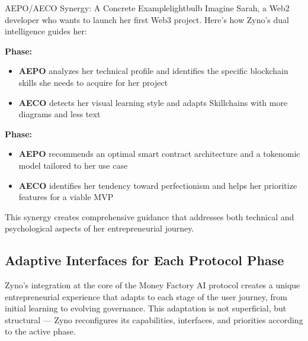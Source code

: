 \begin{mfai-box}{AEPO/AECO Synergy: A Concrete Example}{lightbulb}
Imagine Sarah, a Web2 developer who wants to launch her first Web3 project. Here's how Zyno's dual intelligence guides her:

\textbf{ Phase:}
\begin{itemize}
    \item \textbf{AEPO} analyzes her technical profile and identifies the specific blockchain skills she needs to acquire for her project
    \item \textbf{AECO} detects her visual learning style and adapts Skillchains with more diagrams and less text
\end{itemize}

\textbf{ Phase:}
\begin{itemize}
    \item \textbf{AEPO} recommends an optimal smart contract architecture and a tokenomic model tailored to her use case
    \item \textbf{AECO} identifies her tendency toward perfectionism and helps her prioritize features for a viable MVP
\end{itemize}

This synergy creates comprehensive guidance that addresses both technical and psychological aspects of her entrepreneurial journey.
\end{mfai-box}

\subsection{Adaptive Interfaces for Each Protocol Phase}

Zyno's integration at the core of the Money Factory AI protocol creates a unique entrepreneurial experience that adapts to each stage of the user journey, from initial learning to evolving governance. This adaptation is not superficial, but structural — Zyno reconfigures its capabilities, interfaces, and priorities according to the active phase.

